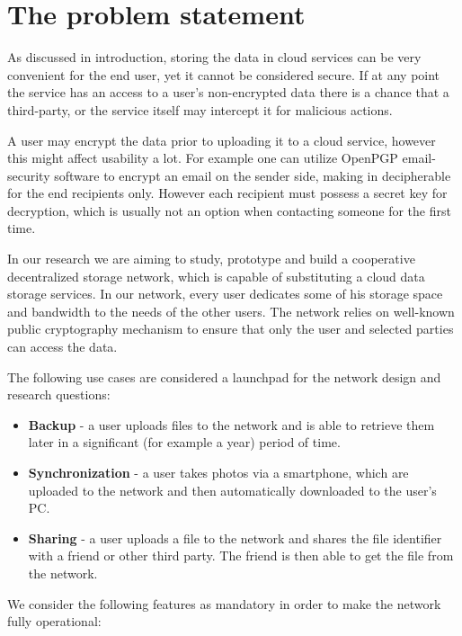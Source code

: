 \section{The problem statement}

As discussed in introduction, storing the data in cloud services
can be very convenient for the end user, yet it cannot be considered
secure. If at any point the service has an access to a user's non-encrypted
data there is a chance that a third-party, or the service itself
may intercept it for malicious actions.

A user may encrypt the data prior to uploading it to a cloud service,
however this might affect usability a lot. For
example one can utilize OpenPGP email-security software \citep{rfc3156} to
encrypt an email on the sender side, making in decipherable for
the end recipients only. However each recipient must possess a secret
key for decryption, which is usually not an option when contacting
someone for the first time.

In our research we are aiming to study, prototype and build a
cooperative decentralized \pp storage network, which is capable
of substituting a cloud data storage services. In our network,
every user dedicates some of his storage space and bandwidth
to the needs of the other users. The network relies on
well-known public cryptography mechanism to ensure that
only the user and selected parties can access the data.

The following use cases are considered a launchpad for the
network design and research questions:

\begin{itemize}
\item \textbf{Backup} - a user uploads files to the network and
      is able to retrieve them later in a significant (for example
      a year) period of time.
\item \textbf{Synchronization} - a user takes photos via a smartphone,
      which are uploaded to the network and then automatically
      downloaded to the user's PC.
\item \textbf{Sharing} - a user uploads a file to the network and
      shares the file identifier with a friend or other third party.
      The friend is then able to get the file from the network.
\end{itemize}

We consider the following features as mandatory in order to make
the network fully operational:

